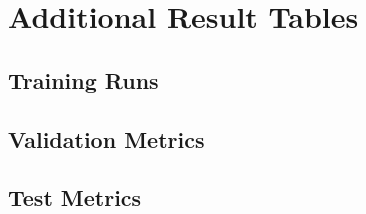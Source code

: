 \chapter{Additional Result Tables}

\section{Training Runs}

\section{Validation Metrics}

\section{Test Metrics}
